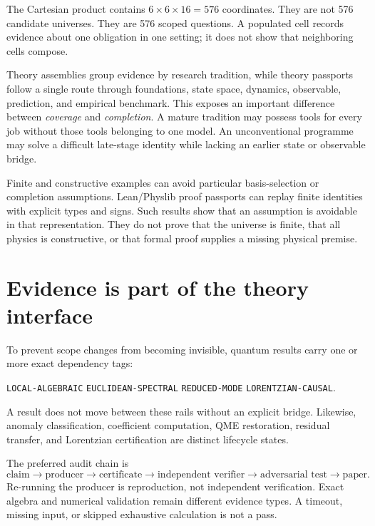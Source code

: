 \documentclass[11pt]{article}
\begin{document}
The Cartesian product contains \(6\times6\times16=576\) coordinates.  They
are not 576 candidate universes.  They are 576 scoped questions.  A populated
cell records evidence about one obligation in one setting; it does not show
that neighboring cells compose.

Theory assemblies group evidence by research tradition, while theory
passports follow a single route through foundations, state space, dynamics,
observable, prediction, and empirical benchmark.  This exposes an important
difference between \emph{coverage} and \emph{completion}.  A mature tradition
may possess tools for every job without those tools belonging to one model.
An unconventional programme may solve a difficult late-stage identity while
lacking an earlier state or observable bridge.

Finite and constructive examples can avoid particular basis-selection or
completion assumptions.  Lean/Physlib proof passports can replay finite
identities with explicit types and signs.  Such results show that an
assumption is avoidable in that representation.  They do not prove that the
universe is finite, that all physics is constructive, or that formal proof
supplies a missing physical premise.

\section{Evidence is part of the theory interface}

To prevent scope changes from becoming invisible, quantum results carry one
or more exact dependency tags:
\begin{center}
\texttt{LOCAL-ALGEBRAIC}\quad
\texttt{EUCLIDEAN-SPECTRAL}\quad
\texttt{REDUCED-MODE}\quad
\texttt{LORENTZIAN-CAUSAL}.
\end{center}
A result does not move between these rails without an explicit bridge.
Likewise, anomaly classification, coefficient computation, QME restoration,
residual transfer, and Lorentzian certification are distinct lifecycle
states.

The preferred audit chain is
\[
 \text{claim}
 \longrightarrow \text{producer}
 \longrightarrow \text{certificate}
 \longrightarrow \text{independent verifier}
 \longrightarrow \text{adversarial test}
 \longrightarrow \text{paper}.
\]
Re-running the producer is reproduction, not independent verification.  Exact
algebra and numerical validation remain different evidence types.  A timeout,
missing input, or skipped exhaustive calculation is not a pass.
\end{document}
